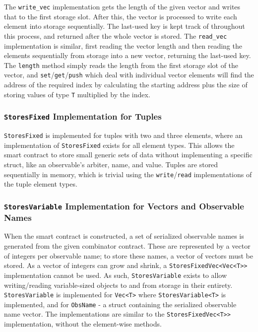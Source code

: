 The \texttt{write\_vec} implementation gets the length of the given vector and writes that to the first storage slot. After this, the vector is processed to write each element into storage sequentially. The last-used key is kept track of throughout this process, and returned after the whole vector is stored. The \texttt{read\_vec} implementation is similar, first reading the vector length and then reading the elements sequentially from storage into a new vector, returning the last-used key. The \texttt{length} method simply reads the length from the first storage slot of the vector, and \texttt{set}/\texttt{get}/\texttt{push} which deal with individual vector elements will find the address of the required index by calculating the starting address plus the size of storing values of type \texttt{T} multiplied by the index.


\subsubsection{\texttt{StoresFixed} Implementation for Tuples}

\texttt{StoresFixed} is implemented for tuples with two and three elements, where an implementation of \texttt{StoresFixed} exists for all element types. This allows the smart contract to store small generic sets of data without implementing a specific struct, like an observable's arbiter, name, and value. Tuples are stored sequentially in memory, which is trivial using the \texttt{write}/\texttt{read} implementations of the tuple element types.


\subsubsection{\texttt{StoresVariable} Implementation for Vectors and Observable Names}

When the smart contract is constructed, a set of serialized observable names is generated from the given combinator contract. These are represented by a vector of integers per observable name; to store these names, a vector of vectors must be stored. As a vector of integers can grow and shrink, a \texttt{StoresFixedVec<Vec<T>{}>} implementation cannot be used. As such, \texttt{StoresVariable} exists to allow writing/reading variable-sized objects to and from storage in their entirety. \texttt{StoresVariable} is implemented for \texttt{Vec<T>} where \texttt{StoresVariable<T>} is implemented, and for \texttt{ObsName} - a struct containing the serialized observable name vector. The implementations are similar to the \texttt{StoresFixedVec<T>{}>} implementation, without the element-wise methods.


